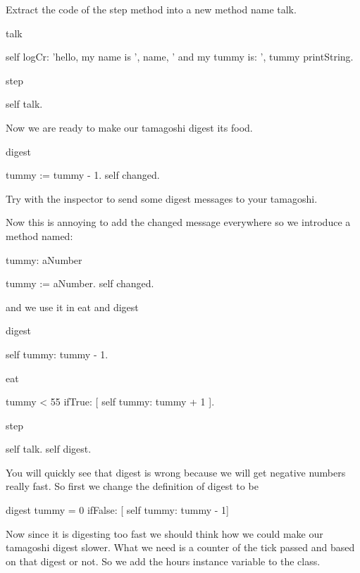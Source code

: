 \documentclass[a4paper,10pt,twoside]{book}
\begin{document}
Extract the code of the step method into a new method name talk.
\begin{code}{}
talk

	self logCr: 'hello, my name is ', name, ' and my tummy is: ', tummy printString.
\end{code}

\begin{code}{}
step

	self talk.
\end{code}

Now we are ready to make our tamagoshi digest its food. 

\begin{code}{}
digest

	tummy := tummy - 1.
	self changed.
\end{code}

Try with the inspector to send some digest messages to your tamagoshi. 


Now this is annoying to add the changed message everywhere so we introduce a method named: 
\begin{code}{}
tummy: aNumber

	tummy := aNumber.
	self changed.
\end{code}

and we use it in eat and digest

\begin{code}{}
digest

	self tummy: tummy - 1.
\end{code}

\begin{code}{}
eat 

	tummy < 55
		ifTrue: [ self tummy: tummy + 1 ]. 
\end{code}

\begin{code}{}
step

	self talk.
	self digest.
\end{code}

You will quickly see that digest is wrong because we will get negative numbers really fast. So first we change 
the definition of digest to be 

\begin{code}{}
digest
	tummy = 0 
		ifFalse: [ self tummy: tummy - 1]
\end{code}

Now since it is digesting too fast we should think how we could make our tamagoshi digest slower. What we need is 
a counter of the tick passed and based on that digest or not. So we add the hours instance variable to the class. 
\end{document}
